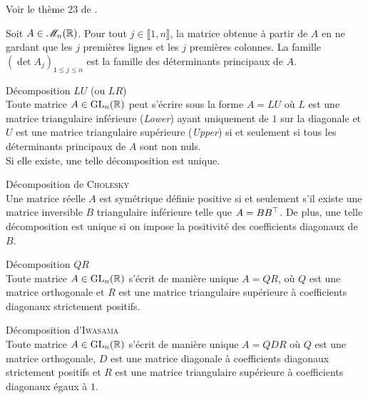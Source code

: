 Voir le thème 23 de \cite{acamanes}.

\begin{defi}
    Soit $A \in \mathscr{M}_n(\mathbb{R})$. Pour tout $j \in \llbracket 1, n \rrbracket$, la matrice obtenue à partir de $A$ en ne gardant que les $j$ premières lignes et les $j$ premières colonnes. La famille $(\det A_j)_{1 \leqslant j \leqslant n}$ est la famille des déterminants principaux de $A$.
\end{defi}


\begin{theo}
    Décomposition $LU$ (ou $LR$) \\
    Toute matrice $A \in \mathrm{GL}_n(\mathbb{R})$ peut s'écrire sous la forme $A = LU$ où $L$ est une matrice triangulaire inférieure (\emph{Lower}) ayant uniquement de $1$ sur la diagonale et $U$ est une matrice triangulaire supérieure (\emph{Upper}) si et seulement si tous les déterminants principaux de $A$ sont non nuls. \\
    Si elle existe, une telle décomposition est unique.
\end{theo}

\begin{theo}
    Décomposition de \textsc{Cholesky} \\
    Une matrice réelle $A$ est symétrique définie positive si et seulement s'il existe une matrice inversible $B$ triangulaire inférieure telle que $A = B B^\top$. De plus, une telle décomposition est unique si on impose la positivité des coefficients diagonaux de $B$.  
\end{theo}  

\begin{theo}
    Décomposition $QR$ \\
    Toute matrice $A \in \mathrm{GL}_n(\mathbb{R})$ s'écrit de manière unique $A = QR$, où $Q$ est une matrice orthogonale et $R$ est une matrice triangulaire supérieure à coefficients diagonaux strictement positifs. 
\end{theo}

\begin{corol}
    Décomposition d'\textsc{Iwasama} \\
    Toute matrice $A \in \mathrm{GL}_n(\mathbb{R})$ s'écrit de manière unique $A = QDR$ où $Q$ est une matrice orthogonale, $D$ est une matrice diagonale à coefficients diagonaux strictement positifs et $R$ est une matrice triangulaire supérieure à coefficients diagonaux égaux à $1$. 
\end{corol}

